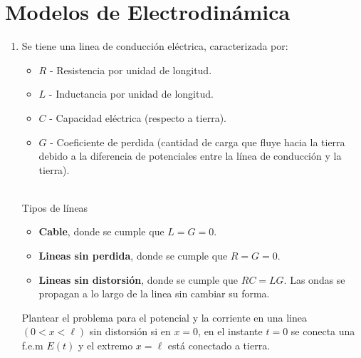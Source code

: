 \documentclass[../main]{subfiles}
\begin{document}
\section{Modelos de Electrodinámica}
\begin{enumerate}
    \item[]  
    \begin{minipage}{0.5\textwidth}
    Se tiene una linea de conducción eléctrica, caracterizada por:
    \begin{itemize}
        \item[] $R$ - Resistencia por unidad de longitud.
        \item[] $L$ - Inductancia por unidad de longitud.
        \item[] $C$ - Capacidad eléctrica (respecto a tierra).
        \item[] $G$ - Coeficiente de perdida (cantidad de carga que fluye hacia la tierra debido a la diferencia de potenciales entre la línea de conducción y la tierra).
    \end{itemize}
    \end{minipage}
    \begin{minipage}{0.5\textwidth}
        
    \end{minipage}\\[0.5cm]
    Tipos de líneas
    \begin{itemize}
        \item \textbf{Cable}, donde se cumple que $L=G=0$. 
        \item \textbf{Lineas sin perdida}, donde se cumple que $R=G=0$.
        \item \textbf{Lineas sin distorsión}, donde se cumple que $RC=LG$. Las ondas se propagan a lo largo de la linea sin cambiar su forma.
    \end{itemize}
    Plantear el problema para el potencial y la corriente en una linea $(0<x<\ell)$ sin distorsión si en $x=0$, en el instante $t=0$ se conecta una f.e.m $E(t)$ y el extremo $x=\ell$ está conectado a tierra.
\end{enumerate}
\end{document}
